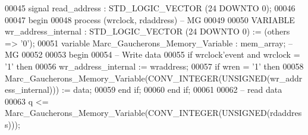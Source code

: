 \begin{DoxyCode}
00045               \textcolor{keywordflow}{signal} \textcolor{vhdlchar}{read_address} \textcolor{vhdlchar}{:}  \textcolor{comment}{STD\_LOGIC\_VECTOR} \textcolor{vhdlchar}{(}\textcolor{vhdllogic}{}\textcolor{vhdllogic}{24} \textcolor{keywordflow}{DOWNTO} \textcolor{vhdllogic}{}\textcolor{vhdllogic}{0}\textcolor{vhdlchar}{)};
00046 
00047 \textcolor{vhdlkeyword}{begin}
00048    \textcolor{keywordflow}{process} (wrclock, rdaddress)\textcolor{keyword}{ -- MG}
00049     
00050     \textcolor{keywordflow}{VARIABLE} \textcolor{vhdlchar}{wr\_address\_internal} \textcolor{vhdlchar}{:} \textcolor{comment}{STD\_LOGIC\_VECTOR} \textcolor{vhdlchar}{(}\textcolor{vhdllogic}{}\textcolor{vhdllogic}{24} \textcolor{keywordflow}{DOWNTO} \textcolor{vhdllogic}{}\textcolor{vhdllogic}{0}\textcolor{vhdlchar}{)} \textcolor{vhdlchar}{:=} \textcolor{vhdlchar}{(}\textcolor{keywordflow}{others} \textcolor{vhdlchar}{=}\textcolor{vhdlchar}{>} \textcolor{vhdlchar}{'}\textcolor{vhdllogic}{}\textcolor{vhdllogic}{0}\textcolor{vhdlchar}{'}\textcolor{vhdlchar}{)};
00051     \textcolor{keywordflow}{variable} \textcolor{vhdlchar}{Marc\_Gaucherons\_Memory\_Variable} \textcolor{vhdlchar}{:} \textcolor{vhdlchar}{mem_array};\textcolor{keyword}{ -- MG}
00052     
00053 \textcolor{vhdlkeyword}{    begin}
00054 \textcolor{keyword}{      -- Write data}
00055       \textcolor{keywordflow}{if} \textcolor{vhdlchar}{wrclock}\textcolor{vhdlchar}{'}\textcolor{vhdlkeyword}{event} \textcolor{keywordflow}{and} \textcolor{vhdlchar}{wrclock} \textcolor{vhdlchar}{=} \textcolor{vhdlchar}{'}\textcolor{vhdllogic}{}\textcolor{vhdllogic}{1}\textcolor{vhdlchar}{'} \textcolor{keywordflow}{then}
00056         \textcolor{vhdlchar}{wr\_address\_internal} \textcolor{vhdlchar}{:=} \textcolor{vhdlchar}{wraddress};
00057         \textcolor{keywordflow}{if} \textcolor{vhdlchar}{wren} \textcolor{vhdlchar}{=} \textcolor{vhdlchar}{'}\textcolor{vhdllogic}{}\textcolor{vhdllogic}{1}\textcolor{vhdlchar}{'} \textcolor{keywordflow}{then} 
00058           \textcolor{vhdlchar}{Marc\_Gaucherons\_Memory\_Variable}\textcolor{vhdlchar}{(}\textcolor{vhdlchar}{CONV\_INTEGER}\textcolor{vhdlchar}{(}\textcolor{comment}{UNSIGNED}\textcolor{vhdlchar}{(}\textcolor{vhdlchar}{wr\_address\_internal}\textcolor{vhdlchar}{)}\textcolor{vhdlchar}{)}\textcolor{vhdlchar}{)} \textcolor{vhdlchar}{:=} \textcolor{vhdlchar}{
      data};
00059         \textcolor{keywordflow}{end} \textcolor{keywordflow}{if};
00060       \textcolor{keywordflow}{end} \textcolor{keywordflow}{if};
00061 
00062 \textcolor{keyword}{      -- read data}
00063       \textcolor{vhdlchar}{q} \textcolor{vhdlchar}{<=} \textcolor{vhdlchar}{Marc\_Gaucherons\_Memory\_Variable}\textcolor{vhdlchar}{(}\textcolor{vhdlchar}{CONV\_INTEGER}\textcolor{vhdlchar}{(}\textcolor{comment}{UNSIGNED}\textcolor{vhdlchar}{(}\textcolor{vhdlchar}{rdaddress}\textcolor{vhdlchar}{)}\textcolor{vhdlchar}{)}\textcolor{vhdlchar}{)};

\end{DoxyCode}

